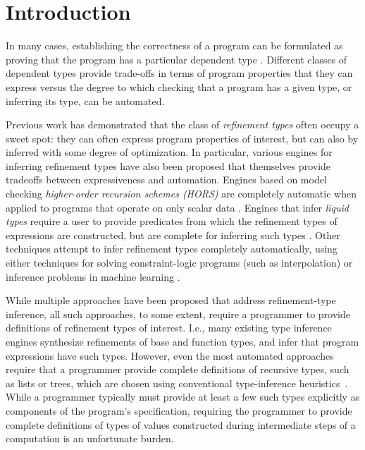 \section{Introduction}
\label{s:intro}
%
In many cases, establishing the correctness of a program can be
formulated as proving that the program has a particular dependent
type
%
.
%
Different classes of dependent types provide trade-offs in terms of
program properties that they can express versus the degree to which
checking that a program has a given type, or inferring its type, can
be automated.

Previous work has demonstrated that the class of \emph{refinement
  types} often occupy a sweet spot: they can often express program
properties of interest, but can also by inferred with some degree of
optimization.
%
In particular, various engines for inferring refinement types have
also been proposed that themselves provide tradeoffs between
expressiveness and automation.
Engines based on model checking \emph{higher-order recursion schemes
  (HORS)} are completely automatic when applied to programs that
operate on only scalar data
%
%
.
Engines that infer \emph{liquid types} require a user to provide
predicates from which the refinement types of expressions are
constructed, but are complete for inferring such types
%
.
Other techniques attempt to infer refinement types completely
automatically, using either techniques for solving constraint-logic
programs (such as interpolation) or inference problems in machine
learning
%
%
.

While multiple approaches have been proposed that address
refinement-type inference, all such approaches, to some extent,
require a programmer to provide definitions of refinement types of
interest.
%
I.e., many existing type inference engines synthesize refinements of
base and function types, and infer that program expressions have such
types.
%
However, even the most automated approaches~\cite{unno09} require that
a programmer provide complete definitions of recursive types, such as
lists or trees, which are chosen using conventional type-inference
heuristics~\cite{pierce98}.
%
While a programmer typically must provide at least a few such types
explicitly as components of the program's specification, requiring the
programmer to provide complete definitions of types of values
constructed during intermediate steps of a computation is an
unfortunate burden.




